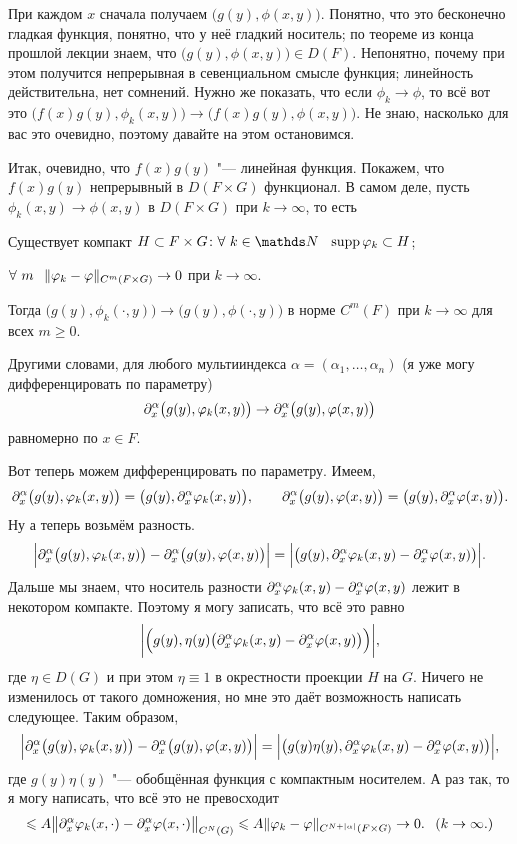 При каждом $x$ сначала получаем $\big(g(y),\phi(x,y)\big)$. Понятно, что это бесконечно гладкая функция, понятно, что у неё гладкий носитель; по теореме из конца прошлой лекции знаем, что $\big(g(y),\phi(x,y)\big)\in D(F)$. Непонятно, почему при этом получится непрерывная в севенциальном смысле функция; линейность действительна, нет сомнений. Нужно же показать, что если $\phi_k\to \phi$, то всё вот это $\big(f(x)g(y),\phi_k(x,y)\big)\to \big(f(x)g(y),\phi(x,y)\big)$. Не знаю, насколько для вас это очевидно, поэтому давайте на этом остановимся.

Итак, очевидно, что $f(x)g(y)$ "--- линейная функция. Покажем, что $f(x)g(y)$ непрерывный в $D(F\times G)$ функционал. В самом деле, пусть $\phi_k(x,y)\to \phi(x,y)$ в $D(F\times G)$ при $k\to \infty$, то есть
\begin{roItems}
  \item Существует компакт $H\subset F\times G\colon \forall\ k\in\N\pau \supp \phi_k\subset H$;
  \item $\forall\ m\pau \|\phi_k-\phi\|_{C^m(F\times G)}\to 0$ при $k\to \infty$.
\end{roItems}
Тогда $\big(g(y),\phi_k(\cdot,y)\big)\to \big(g(y),\phi(\cdot,y)\big)$ в норме $C^m(F)$ при $k\to\infty$ для всех $m\ge 0$.

Другими словами, для любого мультииндекса $\alpha = (\alpha_1,\dots,\alpha_n)$ (я уже могу дифференцировать по параметру)
\[\partial_x^\alpha\big(g(y),\varphi_k(x,y)\big)\rightarrow \partial_x^\alpha \big(g(y),\varphi(x,y)\big)\]
равномерно по $x\in F$.

Вот теперь можем дифференцировать по параметру. Имеем,
\[\partial_x^\alpha \big(g(y),\varphi_k(x,y)\big) = \big(g(y),\partial_x^\alpha\varphi_k(x,y)\big),\qquad
  \partial_x^\alpha \big(g(y),\varphi(x,y)\big) = \big(g(y),\partial_x^\alpha\varphi(x,y)\big).
\]
Ну а теперь возьмём разность.
\[\Big|\partial_x^\alpha \big(g(y),\varphi_k(x,y)\big) - \partial_x^\alpha \big(g(y),\varphi(x,y)\big)\Big| = 
  \Big|\big(g(y),\partial_x^\alpha\varphi_k(x,y) - \partial_x^\alpha\varphi(x,y)\big)\Big|.
\]
Дальше мы знаем, что носитель разности $\partial_x^\alpha\varphi_k(x,y) - \partial_x^\alpha\varphi(x,y)$ лежит в некотором компакте. Поэтому я могу записать, что всё это равно
\[\bigg| \Big(g(y),\eta(y)\big(\partial_x^\alpha\varphi_k(x,y) - \partial_x^\alpha\varphi(x,y)\big)\Big)\bigg|,\]
где $\eta\in D(G)$ и при этом $\eta\equiv1$ в окрестности проекции $H$ на $G$. Ничего не изменилось от такого домножения, но мне это даёт возможность написать следующее. Таким образом,
\[
  \Big|\partial_x^\alpha \big(g(y),\varphi_k(x,y)\big) - \partial_x^\alpha \big(g(y),\varphi(x,y)\big)\Big| =
  \Big| \big(g(y)\eta(y),\partial_x^\alpha\varphi_k(x,y) - \partial_x^\alpha\varphi(x,y)\big)\Big|,
\]
где $g(y)\eta(y)$ "--- обобщённая функция с компактным носителем. А раз так, то я могу написать, что всё это не превосходит
\[
  \leqslant A\big\|\partial_x^\alpha \varphi_k(x,\cdot) -\partial_x^\alpha\varphi(x,\cdot)\big\|_{C^N(G)}\leqslant A\|\varphi_k-\varphi\|_{C^{N+|\alpha|}(F\times G)}\rightarrow 0.\hskip .75em plus.1em minus.08em\relax (k\rightarrow \infty.)
\]

